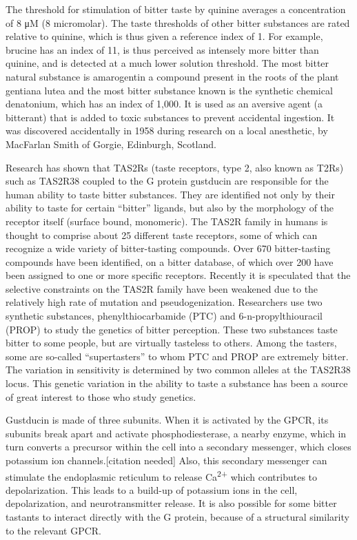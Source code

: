 The threshold for stimulation of bitter taste by quinine averages a concentration of 8 μM (8 micromolar). The taste thresholds of other bitter substances are rated relative to quinine, which is thus given a reference index of 1. For example, brucine has an index of 11, is thus perceived as intensely more bitter than quinine, and is detected at a much lower solution threshold. The most bitter natural substance is amarogentin a compound present in the roots of the plant gentiana lutea and the most bitter substance known is the synthetic chemical denatonium, which has an index of 1,000. It is used as an aversive agent (a bitterant) that is added to toxic substances to prevent accidental ingestion. It was discovered accidentally in 1958 during research on a local anesthetic, by MacFarlan Smith of Gorgie, Edinburgh, Scotland.

Research has shown that TAS2Rs (taste receptors, type 2, also known as T2Rs) such as TAS2R38 coupled to the G protein gustducin are responsible for the human ability to taste bitter substances. They are identified not only by their ability to taste for certain ``bitter'' ligands, but also by the morphology of the receptor itself (surface bound, monomeric). The TAS2R family in humans is thought to comprise about 25 different taste receptors, some of which can recognize a wide variety of bitter-tasting compounds. Over 670 bitter-tasting compounds have been identified, on a bitter database, of which over 200 have been assigned to one or more specific receptors. Recently it is speculated that the selective constraints on the TAS2R family have been weakened due to the relatively high rate of mutation and pseudogenization. Researchers use two synthetic substances, phenylthiocarbamide (PTC) and 6-n-propylthiouracil (PROP) to study the genetics of bitter perception. These two substances taste bitter to some people, but are virtually tasteless to others. Among the tasters, some are so-called ``supertasters'' to whom PTC and PROP are extremely bitter. The variation in sensitivity is determined by two common alleles at the TAS2R38 locus. This genetic variation in the ability to taste a substance has been a source of great interest to those who study genetics.

Gustducin is made of three subunits. When it is activated by the GPCR, its subunits break apart and activate phosphodiesterase, a nearby enzyme, which in turn converts a precursor within the cell into a secondary messenger, which closes potassium ion channels.{[}citation needed{]} Also, this secondary messenger can stimulate the endoplasmic reticulum to release Ca\textsuperscript{2+} which contributes to depolarization. This leads to a build-up of potassium ions in the cell, depolarization, and neurotransmitter release. It is also possible for some bitter tastants to interact directly with the G protein, because of a structural similarity to the relevant GPCR.

